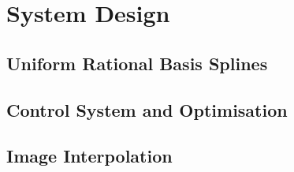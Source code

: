 \chapter{System Design}


\section{Uniform Rational Basis Splines}




\section{Control System and Optimisation}









\section{Image Interpolation}